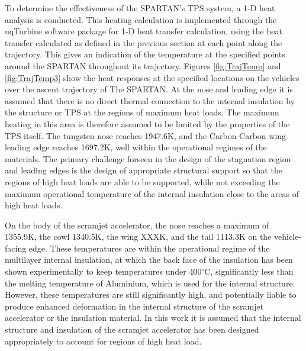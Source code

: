  
To determine the effectiveness of the SPARTAN's TPS system, a 1-D heat analysis is conducted.  
This heating calculation is implemented through the uqTurbine software package for 1-D heat transfer calculation, using the heat transfer calculated as defined in the previous section at each point along the trajectory. 
This gives an indication of the temperature at the specified points around the SPARTAN throughout its trajectory. 
Figures \ref{fig:TrajTemp} and \ref{fig:TrajTemp3} show the heat responses at the specified locations on the vehicles over the ascent trajectory of The SPARTAN. At the nose and leading edge it is assumed that there is no direct thermal connection to the internal insulation by the structure or TPS at the regions of maximum heat loads. The maximum heating in this area is therefore assumed to be limited by the properties of the TPS itself. The tungsten nose reaches 1947.6K, and the Carbon-Carbon wing leading edge reaches 1697.2K, well within the operational regimes of the materials. The primary challenge forseen in the design of the stagnation region and leading edges is the design of appropriate structural support so that the regions of high heat loads are able to be supported, while not exceeding the maximum operational temperature of the internal insulation close to the areas of high heat loads.  

On the body of the scramjet accelerator, the nose reaches a maximum of 1355.9K, the cowl 1340.5K, the wing XXXK, and the tail 1113.3K on the vehicle-facing edge. These temperatures are within the operational regime of the multilayer internal insulation, at which the back face of the insulation has been shown experimentally to keep temperatures under 400$^\circ$C\cite{Kourtides}, significantly less than the melting temperature of Aluminium, which is used for the internal structure. However, these temperatures are still significantly high, and potentially liable to produce enhanced deformation in the internal structure of the scramjet accelerator or the insulation material. In this work it is assumed that the internal structure and insulation of the scramjet accelerator has been designed appropriately to account for regions of high heat load. 






